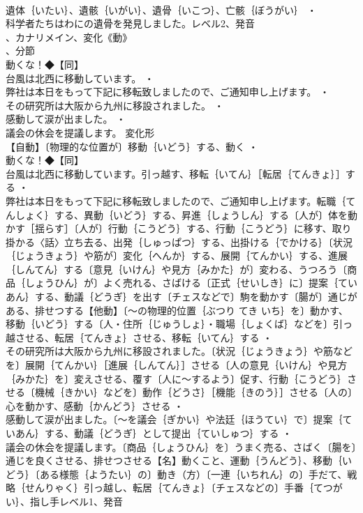 \documentclass[8pt]{extreport}
\begin{document}
\begin{CJK}{UTF8}{min}
\\	遺体｛いたい｝、遺骸｛いがい｝、遺骨｛いこつ｝、亡骸｛ぼうがい｝ ・
\\	科学者たちはわにの遺骨を発見しました。レベル2、発音
\\	、カナリメイン、変化《動》
\\	、分節
\\	動くな！◆【同】
\\	台風は北西に移動しています。 ・
\\	弊社は本日をもって下記に移転致しましたので、ご通知申し上げます。 ・
\\	その研究所は大阪から九州に移設されました。 ・
\\	感動して涙が出ました。 ・
\\	議会の休会を提議します。	変化形 
\\	【自動】〔物理的な位置が〕移動｛いどう｝する、動く ・
\\	動くな！◆【同】
\\	台風は北西に移動しています。引っ越す、移転｛いてん｝［転居｛てんきょ｝］する ・
\\	弊社は本日をもって下記に移転致しましたので、ご通知申し上げます。転職｛てんしょく｝する、異動｛いどう｝する、昇進｛しょうしん｝する〔人が〕体を動かす［揺らす］〔人が〕行動｛こうどう｝する、行動｛こうどう｝に移す、取り掛かる〈話〉立ち去る、出発｛しゅっぱつ｝する、出掛ける｛でかける｝〔状況｛じょうきょう｝や筋が〕変化｛へんか｝する、展開｛てんかい｝する、進展｛しんてん｝する〔意見｛いけん｝や見方｛みかた｝が〕変わる、うつろう〔商品｛しょうひん｝が〕よく売れる、さばける〔正式｛せいしき｝に〕提案｛ていあん｝する、動議｛どうぎ｝を出す〔チェスなどで〕駒を動かす〔腸が〕通じがある、排せつする【他動】〔～の物理的位置｛ぶつり てき いち｝を〕動かす、移動｛いどう｝する〔人・住所｛じゅうしょ｝・職場｛しょくば｝などを〕引っ越させる、転居｛てんきょ｝させる、移転｛いてん｝する ・
\\	その研究所は大阪から九州に移設されました。〔状況｛じょうきょう｝や筋などを〕展開｛てんかい｝［進展｛しんてん｝］させる〔人の意見｛いけん｝や見方｛みかた｝を〕変えさせる、覆す〔人に～するよう〕促す、行動｛こうどう｝させる〔機械｛きかい｝などを〕動作｛どうさ｝［機能｛きのう｝］させる〔人の〕心を動かす、感動｛かんどう｝させる ・
\\	感動して涙が出ました。〔～を議会｛ぎかい｝や法廷｛ほうてい｝で〕提案｛ていあん｝する、動議｛どうぎ｝として提出｛ていしゅつ｝する ・
\\	議会の休会を提議します。〔商品｛しょうひん｝を〕うまく売る、さばく〔腸を〕通じを良くさせる、排せつさせる【名】動くこと、運動｛うんどう｝、移動｛いどう｝〔ある様態｛ようたい｝の〕動き（方）〔一連｛いちれん｝の〕手だて、戦略｛せんりゃく｝引っ越し、転居｛てんきょ｝〔チェスなどの〕手番｛てつがい｝、指し手レベル1、発音

\end{CJK}
\end{document}
